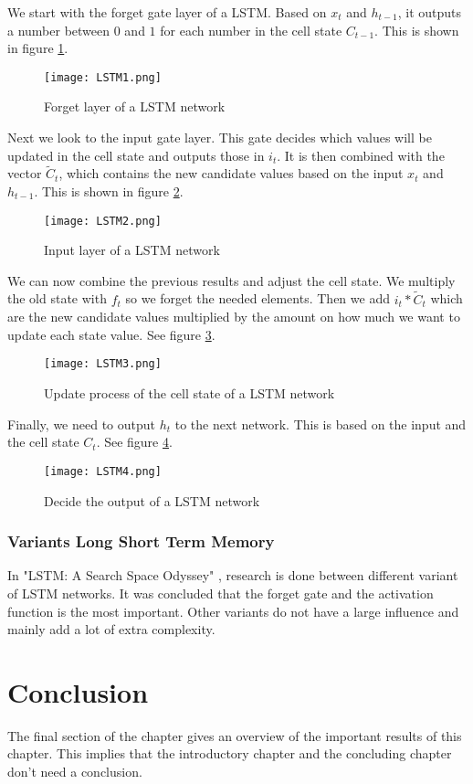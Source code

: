 We start with the forget gate layer of a LSTM. Based on $x_t$ and $h_{t-1}$, it outputs a number between $0$ and $1$ for each number in the cell state $C_{t-1}$. This is shown in figure \ref{fig:LSTM1}.

\begin{figure}[H]
	\centering
	\texttt{[image: LSTM1.png]}
	\caption{Forget layer of a LSTM network \cite{lstmGood:online}}
	\label{fig:LSTM1}
\end{figure} 

Next we look to the input gate layer. This gate decides which values will be updated in the cell state and outputs those in $i_t$. It is then combined with the vector $\widetilde{C}_t$, which contains the new candidate values based on the input $x_t$ and $h_{t-1}$. This is shown in figure \ref{fig:LSTM2}.

\begin{figure}[H]
	\centering
	\texttt{[image: LSTM2.png]}
	\caption{Input layer of a LSTM network \cite{lstmGood:online}}
	\label{fig:LSTM2}
\end{figure} 

We can now combine the previous results and adjust the cell state. We multiply the old state with $f_t$ so we forget the needed elements. Then we add $i_t*\widetilde{C}_t$ which are the new candidate values multiplied by the amount on how much we want to update each state value. See figure \ref{fig:LSTM3}.

\begin{figure}[H]
	\centering
	\texttt{[image: LSTM3.png]}
	\caption{Update process of the cell state of a LSTM network \cite{lstmGood:online}}
	\label{fig:LSTM3}
\end{figure} 

Finally, we need to output $h_t$ to the next network. This is based on the input and the cell state $C_t$. See figure \ref{fig:LSTM4}.

\begin{figure}[H]
	\centering
	\texttt{[image: LSTM4.png]}
	\caption{Decide the output of a LSTM network \cite{lstmGood:online}}
	\label{fig:LSTM4}
\end{figure} 


\subsubsection{Variants Long Short Term Memory}

In "LSTM: A Search Space Odyssey" \cite{lstmSpace:article}, research is done between different variant of LSTM networks. It was concluded that the forget gate and the activation function is the most important. Other variants do not have a large influence and mainly add a lot of extra complexity.


\section{Conclusion}
The final section of the chapter gives an overview of the important results
of this chapter. This implies that the introductory chapter and the
concluding chapter don't need a conclusion.



